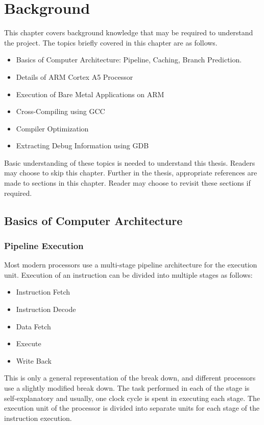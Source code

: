 \chapter{Background}
This chapter covers background knowledge that may be required to understand the project. The topics briefly covered in this chapter are as follows.

\begin{itemize} \itemsep -6pt
\item Basics of Computer Architecture: Pipeline, Caching, Branch Prediction.
\item Details of ARM Cortex A5 Processor
\item Execution of Bare Metal Applications on ARM
\item Cross-Compiling using GCC
\item Compiler Optimization
\item Extracting Debug Information using GDB
\end{itemize}

Basic understanding of these topics is needed to understand this thesis. Readers may choose to skip this chapter. Further in the thesis, appropriate references are made to sections in this chapter. Reader may choose to revisit these sections if required.

\section{Basics of Computer Architecture}
\subsection{Pipeline Execution}
\label{subsec:PipelineExecution}
Most modern processors use a multi-stage pipeline architecture for the execution unit. Execution of an instruction can be divided into multiple stages as follows:

\begin{itemize} \itemsep -6pt
\item Instruction Fetch
\item Instruction Decode
\item Data Fetch
\item Execute
\item Write Back
\end{itemize}

This is only a general representation of the break down, and different processors use a slightly modified break down. The task performed in each of the stage is self-explanatory and usually, one clock cycle is spent in executing each stage. The execution unit of the processor is divided into separate units for each stage of the instruction execution.

